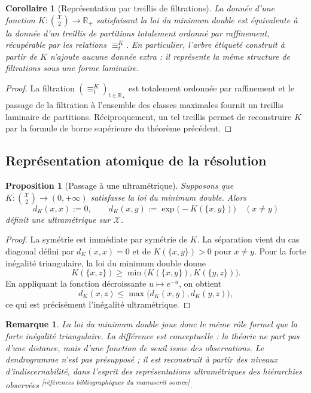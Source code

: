 \documentclass[11pt,a4paper,openany]{book}
\newtheorem{proposition}[definition]{Proposition}
\newtheorem{corollary}[definition]{Corollaire}
\newtheorem{remark}[definition]{Remarque}
\begin{document}
\begin{corollary}[Représentation par treillis de filtrations]
La donnée d'une fonction \(K:\binom{\mathcal X}{2}\to\mathbb R_+\) satisfaisant la loi du minimum double est équivalente à la donnée d'un treillis de partitions totalement ordonné par raffinement, récupérable par les relations \(\equiv_t^K\). En particulier, l'arbre étiqueté construit à partir de \(K\) n'ajoute aucune donnée extra : il représente la même structure de filtrations sous une forme laminaire.
\end{corollary}

\begin{proof}
La filtration \((\equiv_t^K)_{t\in\mathbb R_+}\) est totalement ordonnée par raffinement et le passage de la filtration à l'ensemble des classes maximales fournit un treillis laminaire de partitions. Réciproquement, un tel treillis permet de reconstruire \(K\) par la formule de borne supérieure du théorème précédent.
\end{proof}

\subsection{Représentation atomique de la résolution}

\begin{proposition}[Passage à une ultramétrique]
Supposons que \(K:\binom{\mathcal X}{2}\to(0,+\infty)\) satisfasse la loi du minimum double. Alors
\[
d_K(x,x):=0,\qquad
d_K(x,y):=\exp\!\bigl(-K(\{x,y\})\bigr)\quad(x\neq y)
\]
définit une ultramétrique sur \(\mathcal X\).
\end{proposition}

\begin{proof}
La symétrie est immédiate par symétrie de $K$. La séparation vient du cas diagonal défini par $d_K(x,x)=0$ et de $K(\{x,y\})>0$ pour $x\neq y$. Pour la forte inégalité triangulaire, la loi du minimum double donne
\[
K(\{x,z\})\ge \min\bigl(K(\{x,y\}),K(\{y,z\})\bigr).
\]
En appliquant la fonction décroissante \(u\mapsto e^{-u}\), on obtient
\[
d_K(x,z)\le \max\bigl(d_K(x,y),d_K(y,z)\bigr),
\]
ce qui est précisément l'inégalité ultramétrique.
\end{proof}

\begin{remark}
La loi du minimum double joue donc le même rôle formel que la forte inégalité triangulaire. La différence est conceptuelle : la théorie ne part pas d'une distance, mais d'une fonction de seuil issue des observations. Le dendrogramme n'est pas présupposé ; il est reconstruit à partir des niveaux d'indiscernabilité, dans l'esprit des représentations ultramétriques des hiérarchies observées \textsuperscript{[références bibliographiques du manuscrit source]}.
\end{remark}
\end{document}
